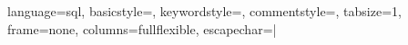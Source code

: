 
 {
   language=sql,
   basicstyle=\tiny\ttfamily,
   keywordstyle=\ttfamily,
   commentstyle=\color{gray}\ttfamily,
   tabsize=1,
   frame=none,
   columns=fullflexible,
   escapechar=| %
}